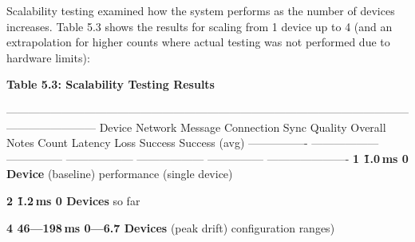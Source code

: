 Scalability testing examined how the system performs as the number of
devices increases. Table 5.3 shows the results for scaling from 1 device
up to 4 (and an extrapolation for higher counts where actual testing was
not performed due to hardware limits):

\textbf{Table 5.3: Scalability Testing Results}

  ------------------------------------------------------------------------------------------------------------------------------------
  Device      Network      Message    Connection   Sync Quality Overall    Notes
  Count       Latency      Loss       Success                   Success    
              (avg)                                                        
  ---------------- ------------------ --------------- ------------------ ------------------ --------------- ----------------------
  \textbf{1         \~1.0 ms     0%
  Device}                                         (baseline)              performance
                                                                           (single device)

  \textbf{2         \~1.2 ms     0%
  Devices}                                                                so far

  \textbf{4         46---198 ms   0---6.7%
  Devices}   (peak                                drift)                  configuration
              ranges)                                                      

